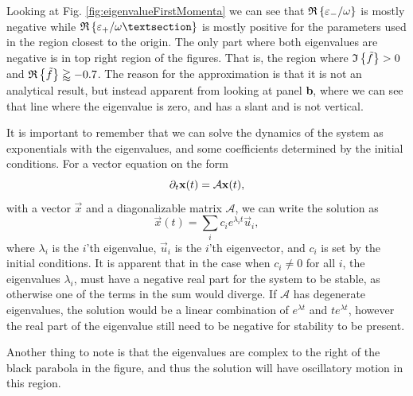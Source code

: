 Looking at Fig. \ref{fig:eigenvalueFirstMomenta} we can see that $\mathfrak{R}\left\{\varepsilon_- / \omega\right\}$ is mostly negative while $\re{\varepsilon_+ / \omega§}$ is mostly positive for the parameters used in the region closest to the origin. The only part where both eigenvalues are negative is in top right region of the figures. That is, the region where $\mathfrak{I}\left\{\tilde{f}\right\} > 0$ and $\mathfrak{R}\left\{\tilde{f}\right\} \gtrapprox -0.7$. The reason for the approximation is that it is not an analytical result, but instead apparent from looking at panel \textbf{b}, where we can see that line where the eigenvalue is zero, and has a slant and is not vertical. 

It is important to remember that we can solve the dynamics of the system as exponentials with the eigenvalues, and some coefficients determined by the initial conditions. For a vector equation on the form
\begin{equation}
    \partial_t \mathbf{x}(t) = \mathcal{A}\mathbf{x}(t),
\end{equation}
with a vector $\vec{x}$ and a diagonalizable matrix $\mathcal{A}$, we can write the solution as
\begin{equation}
    \vec{x}(t) = \sum_i c_i e^{\lambda_i t} \vec{u}_i,
\end{equation}
where $\lambda_i$ is the $i$'th eigenvalue, $\vec{u}_i$ is the $i$'th eigenvector, and $c_i$ is set by the initial conditions. It is apparent that in the case when $c_i \neq 0$ for all $i$, the eigenvalues $\lambda_i$, must have a negative real part for the system to be stable, as otherwise one of the terms in the sum would diverge. If $\mathcal{A}$ has degenerate eigenvalues, the solution would be a linear combination of $e^{\lambda t} $ and $t e^{\lambda t}$, however the real part of the eigenvalue still need to be negative for stability to be present.

Another thing to note is that the eigenvalues are complex to the right of the black parabola in the figure, and thus the solution will have oscillatory motion in this region.

